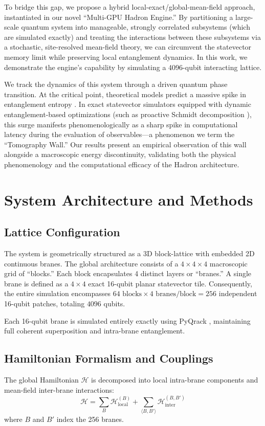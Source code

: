 \documentclass[aps,pra,reprint,superscriptaddress,nofootinbib]{revtex4-2}
\begin{document}
To bridge this gap, we propose a hybrid local-exact/global-mean-field approach, instantiated in our novel ``Multi-GPU Hadron Engine.'' By partitioning a large-scale quantum system into manageable, strongly correlated subsystems (which are simulated exactly) and treating the interactions between these subsystems via a stochastic, site-resolved mean-field theory, we can circumvent the statevector memory limit while preserving local entanglement dynamics. In this work, we demonstrate the engine's capability by simulating a 4096-qubit interacting lattice.

We track the dynamics of this system through a driven quantum phase transition. At the critical point, theoretical models predict a massive spike in entanglement entropy \cite{vidal2003entanglement}. In exact statevector simulators equipped with dynamic entanglement-based optimizations (such as proactive Schmidt decomposition \cite{strano2023exact}), this surge manifests phenomenologically as a sharp spike in computational latency during the evaluation of observables---a phenomenon we term the ``Tomography Wall.'' Our results present an empirical observation of this wall alongside a macroscopic energy discontinuity, validating both the physical phenomenology and the computational efficacy of the Hadron architecture.

\section{System Architecture and Methods}

\subsection{Lattice Configuration}
The system is geometrically structured as a 3D block-lattice with embedded 2D continuous branes. The global architecture consists of a $4 \times 4 \times 4$ macroscopic grid of ``blocks.'' Each block encapsulates 4 distinct layers or ``branes.'' A single brane is defined as a $4 \times 4$ exact 16-qubit planar statevector tile. Consequently, the entire simulation encompasses $64 \text{ blocks} \times 4 \text{ branes/block} = 256$ independent 16-qubit patches, totaling $4096$ qubits. 

Each 16-qubit brane is simulated entirely exactly using PyQrack \cite{strano2023exact}, maintaining full coherent superposition and intra-brane entanglement.

\subsection{Hamiltonian Formalism and Couplings}
The global Hamiltonian $\mathcal{H}$ is decomposed into local intra-brane components and mean-field inter-brane interactions:
\begin{equation}
\mathcal{H} = \sum_{B} \mathcal{H}_{\text{local}}^{(B)} + \sum_{\langle B, B' \rangle} \mathcal{H}_{\text{inter}}^{(B, B')}
\end{equation}
where $B$ and $B'$ index the 256 branes.
\end{document}
